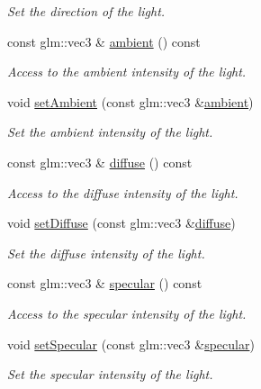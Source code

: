 \begin{DoxyCompactItemize}
\begin{DoxyCompactList}\small\item\em Set the direction of the light. \end{DoxyCompactList}\item 
const glm\+::vec3 \& \hyperlink{classDirectionalLight_a348fa5150e5959b26411715b6ba1bff2}{ambient} () const 
\begin{DoxyCompactList}\small\item\em Access to the ambient intensity of the light. \end{DoxyCompactList}\item 
void \hyperlink{classDirectionalLight_ad2317a4398d25c19c0c7ecda894a9e03}{set\+Ambient} (const glm\+::vec3 \&\hyperlink{classDirectionalLight_a348fa5150e5959b26411715b6ba1bff2}{ambient})
\begin{DoxyCompactList}\small\item\em Set the ambient intensity of the light. \end{DoxyCompactList}\item 
const glm\+::vec3 \& \hyperlink{classDirectionalLight_ab0314fdc6fb9722f4bf17c198df348f9}{diffuse} () const 
\begin{DoxyCompactList}\small\item\em Access to the diffuse intensity of the light. \end{DoxyCompactList}\item 
void \hyperlink{classDirectionalLight_ab646ca1453dd80a76fa333ae74576bf4}{set\+Diffuse} (const glm\+::vec3 \&\hyperlink{classDirectionalLight_ab0314fdc6fb9722f4bf17c198df348f9}{diffuse})
\begin{DoxyCompactList}\small\item\em Set the diffuse intensity of the light. \end{DoxyCompactList}\item 
const glm\+::vec3 \& \hyperlink{classDirectionalLight_a46773cdc52f5a93e05c25a1742257312}{specular} () const 
\begin{DoxyCompactList}\small\item\em Access to the specular intensity of the light. \end{DoxyCompactList}\item 
void \hyperlink{classDirectionalLight_aaf7612501976569deb935ee0dc70eda5}{set\+Specular} (const glm\+::vec3 \&\hyperlink{classDirectionalLight_a46773cdc52f5a93e05c25a1742257312}{specular})
\begin{DoxyCompactList}\small\item\em Set the specular intensity of the light. \end{DoxyCompactList}\end{DoxyCompactItemize}
